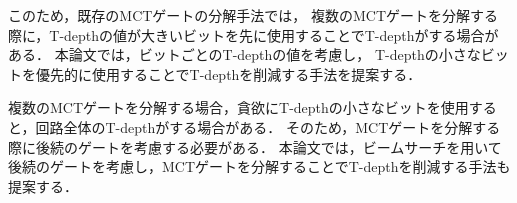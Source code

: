   \par
  このため，既存のMCTゲートの分解手法では，
  複数のMCTゲートを分解する際に，T-depthの値が大きいビットを先に使用することでT-depthがする場合がある．
  本論文では，ビットごとのT-depthの値を考慮し，
  T-depthの小さなビットを優先的に使用することでT-depthを削減する手法を提案する．
  \par
  複数のMCTゲートを分解する場合，貪欲にT-depthの小さなビットを使用すると，回路全体のT-depthがする場合がある．
  そのため，MCTゲートを分解する際に後続のゲートを考慮する必要がある．
  本論文では，ビームサーチを用いて後続のゲートを考慮し，MCTゲートを分解することでT-depthを削減する手法も提案する．
